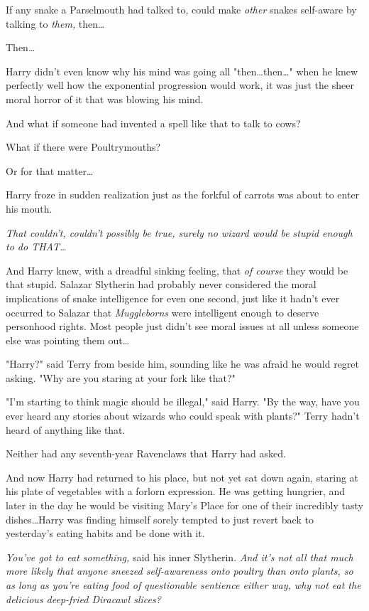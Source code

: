 If any snake a Parselmouth had talked to, could make \emph{other} snakes
self-aware by talking to \emph{them,} then…

Then…

Harry didn't even know why his mind was going all "then…then…"
when he knew perfectly well how the exponential progression would work, it was
just the sheer moral horror of it that was blowing his mind.

And what if someone had invented a spell like that to talk to cows?

What if there were Poultrymouths?

Or for that matter…

Harry froze in sudden realization just as the forkful of carrots was about to
enter his mouth.

\emph{That couldn't, couldn't possibly be true, surely no wizard would be
stupid enough to do THAT…}

And Harry knew, with a dreadful sinking feeling, that \emph{of course} they
would be that stupid. Salazar Slytherin had probably never considered the moral
implications of snake intelligence for even one second, just like it hadn't
ever occurred to Salazar that \emph{Muggleborns} were intelligent enough to
deserve personhood rights. Most people just didn't see moral issues at all
unless someone else was pointing them out…

"Harry?" said Terry from beside him, sounding like he was afraid he would
regret asking. "Why are you staring at your fork like that?"

"I'm starting to think magic should be illegal," said Harry. "By the way, have
you ever heard any stories about wizards who could speak with plants?"
\later
Terry hadn't heard of anything like that.

Neither had any seventh-year Ravenclaws that Harry had asked.

And now Harry had returned to his place, but not yet sat down again, staring at
his plate of vegetables with a forlorn expression. He was getting hungrier, and
later in the day he would be visiting Mary's Place for one of their incredibly
tasty dishes…Harry was finding himself sorely tempted to just revert
back to yesterday's eating habits and be done with it.

\emph{You've got to eat something,} said his inner Slytherin. \emph{And it's
not all that much \emph{more} likely that anyone sneezed self-awareness onto
poultry than onto plants, so as long as you're eating food of questionable
sentience either way, why not eat the delicious deep-fried Diracawl slices?}

